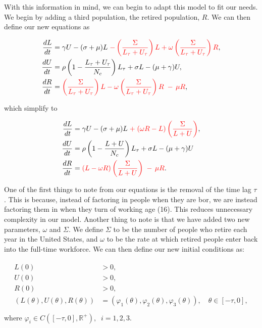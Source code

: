 \documentclass{article}
\begin{document}
With this information in mind, we can begin to adapt this model to fit our needs. We begin by adding a third population, the retired population, $R$.
We can then define our new equations as

\begin{align}
    \begin{split}
        \frac{dL}{dt} &= \gamma U - (\sigma + \mu)L {\color{red}\;- \left(\frac{\Sigma}{L_{\tau} + U_{\tau}}\right) L + \omega\left(\frac{\Sigma}{L_{\tau} + U_{\tau}}\right) R},\\
        \frac{dU}{dt} &= \rho\left(1 - \frac{L_{\tau} + U_{\tau}}{N_c} \right)L_{\tau} + \sigma L -(\mu + \gamma)U,  \\
        \frac{dR}{dt} &= {\color{red}\left(\frac{\Sigma}{L_{\tau} + U_{\tau}}\right) L - \omega\left(\frac{\Sigma}{L_{\tau} + U_{\tau}}\right) R \; - \, \mu R},
    \end{split}
\end{align}

which simplify to 

\begin{align}
    \begin{split}
        \frac{dL}{dt} &= \gamma U - (\sigma + \mu)L {\color{red}\; + \;(\omega R - L)\left(\frac{\Sigma}{L + U}\right)},\\
        \frac{dU}{dt} &= \rho\left(1 - \frac{L + U}{N_c} \right)L_{\tau} + \sigma L -(\mu + \gamma)U  \\
        \frac{dR}{dt} &= {\color{red}(L - \omega R)\left(\frac{\Sigma}{L + U}\right) \; - \, \mu R}.
    \end{split}
\end{align}

One of the first things to note from our equations is the removal of the time lag $\tau$. 
This is because, instead of factoring in people when they are bor, we are instead factoring them
in when they turn of working age (16). This reduces unnecessary complexity in our model. Another thing to note
is that we have added two new parameters, $\omega$ and $\Sigma$. We define $\Sigma$ to be the number of people who
retire each year in the United States, and $\omega$ to be the rate at which retired people enter back
into the full-time workforce. We can then define our new initial conditions as:

\begin{align}
    \begin{split}
        L(0) &> 0 , \\
        U(0) &> 0, \\
        R(0) &> 0, \\
        (L(\theta),U(\theta), R(\theta)) &= (\varphi_1(\theta), \varphi_2(\theta), \varphi_3(\theta)), \quad \theta \in [-\tau,0], \\
    \end{split}
\end{align}
where $\varphi_i\in C([-\tau, 0], \mathbb{R}^+),\;\; i=1,2,3$.
\end{document}
